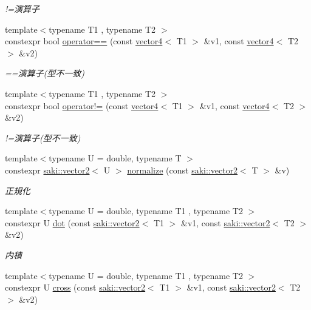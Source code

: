 \begin{DoxyCompactItemize}
\begin{DoxyCompactList}\small\item\em !=演算子 \end{DoxyCompactList}\item 
{\footnotesize template$<$typename T1 , typename T2 $>$ }\\constexpr bool \mbox{\hyperlink{namespacesaki_af2a10e5e2974f482b6da75d9137dc143}{operator==}} (const \mbox{\hyperlink{classsaki_1_1vector4}{vector4}}$<$ T1 $>$ \&v1, const \mbox{\hyperlink{classsaki_1_1vector4}{vector4}}$<$ T2 $>$ \&v2)
\begin{DoxyCompactList}\small\item\em ==演算子(型不一致) \end{DoxyCompactList}\item 
{\footnotesize template$<$typename T1 , typename T2 $>$ }\\constexpr bool \mbox{\hyperlink{namespacesaki_abf6f98117a7a12898df59d2041040000}{operator!=}} (const \mbox{\hyperlink{classsaki_1_1vector4}{vector4}}$<$ T1 $>$ \&v1, const \mbox{\hyperlink{classsaki_1_1vector4}{vector4}}$<$ T2 $>$ \&v2)
\begin{DoxyCompactList}\small\item\em !=演算子(型不一致) \end{DoxyCompactList}\item 
{\footnotesize template$<$typename U  = double, typename T $>$ }\\constexpr \mbox{\hyperlink{classsaki_1_1vector2}{saki\+::vector2}}$<$ U $>$ \mbox{\hyperlink{namespacesaki_a0ca208fb45c585d9cd23276fb91e40ee}{normalize}} (const \mbox{\hyperlink{classsaki_1_1vector2}{saki\+::vector2}}$<$ T $>$ \&v)
\begin{DoxyCompactList}\small\item\em 正規化 \end{DoxyCompactList}\item 
{\footnotesize template$<$typename U  = double, typename T1 , typename T2 $>$ }\\constexpr U \mbox{\hyperlink{namespacesaki_a820a45ae402c8447bce4fee36a1f7d62}{dot}} (const \mbox{\hyperlink{classsaki_1_1vector2}{saki\+::vector2}}$<$ T1 $>$ \&v1, const \mbox{\hyperlink{classsaki_1_1vector2}{saki\+::vector2}}$<$ T2 $>$ \&v2)
\begin{DoxyCompactList}\small\item\em 内積 \end{DoxyCompactList}\item 
{\footnotesize template$<$typename U  = double, typename T1 , typename T2 $>$ }\\constexpr U \mbox{\hyperlink{namespacesaki_a457d78ffe360e1d8a78d14ec5dab38f2}{cross}} (const \mbox{\hyperlink{classsaki_1_1vector2}{saki\+::vector2}}$<$ T1 $>$ \&v1, const \mbox{\hyperlink{classsaki_1_1vector2}{saki\+::vector2}}$<$ T2 $>$ \&v2)

\end{DoxyCompactItemize}
